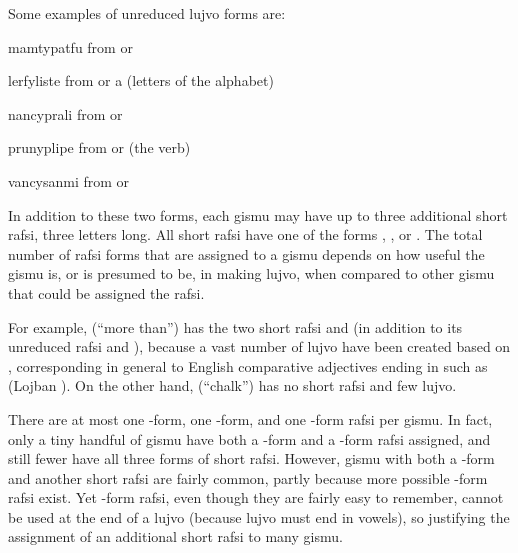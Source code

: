 Some examples of unreduced lujvo forms are:
\begin{example}
mamtypatfu\n
from \n
{} or 
\end{example}

\begin{example}
lerfyliste\n
from \n
{} or a \n
(letters of the alphabet)
\end{example}

\begin{example}
nancyprali\n
from \n
{} or 
\end{example}

\begin{example}
prunyplipe\n
from \n
{} or  (the verb)
\end{example}

\begin{example}
vancysanmi\n
from \n
{} or 
\end{example}

In addition to these two forms, each gismu may have up to three additional short rafsi, three letters long. All short rafsi have one of the forms , , or . The total number of rafsi forms that are assigned to a gismu depends on how useful the gismu is, or is presumed to be, in making lujvo, when compared to other gismu that could be assigned the rafsi. 

For example,  (``more than'') has the two short rafsi  and  (in addition to its unreduced rafsi  and ), because a vast number of lujvo have been created based on , corresponding in general to English comparative adjectives ending in  such as  (Lojban ). On the other hand,  (``chalk'') has no short rafsi and few lujvo.

There are at most one -form, one -form, and one -form rafsi per gismu. In fact, only a tiny handful of gismu have both a -form and a -form rafsi assigned, and still fewer have all three forms of short rafsi. However, gismu with both a -form and another short rafsi are fairly common, partly because more possible -form rafsi exist. Yet -form rafsi, even though they are fairly easy to remember, cannot be used at the end of a lujvo (because lujvo must end in vowels), so justifying the assignment of an additional short rafsi to many gismu.

